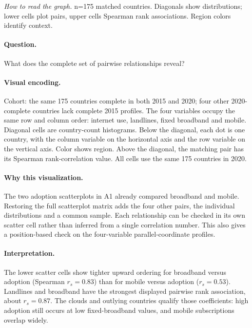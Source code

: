 \documentclass[conference,a4paper]{IEEEtran}
\begin{document}
\noindent\textit{How to read the graph.} n=175 matched countries. Diagonals show distributions; lower cells plot pairs, upper cells Spearman rank associations. Region colors identify context.

\paragraph{Question.} What does the complete set of pairwise relationships reveal?



\paragraph{Visual encoding.} Cohort: the same 175 countries complete in both 2015 and 2020; four other 2020-complete countries lack complete 2015 profiles. The four variables occupy the same row and column order: internet use, landlines, fixed broadband and mobile. Diagonal cells are country-count histograms. Below the diagonal, each dot is one country, with the column variable on the horizontal axis and the row variable on the vertical axis. Color shows region. Above the diagonal, the matching pair has its Spearman rank-correlation value. All cells use the same 175 countries in 2020.



\paragraph{Why this visualization.} The two adoption scatterplots in A1 already compared broadband and mobile. Restoring the full scatterplot matrix adds the four other pairs, the individual distributions and a common sample. Each relationship can be checked in its own scatter cell rather than inferred from a single correlation number. This also gives a position-based check on the four-variable parallel-coordinate profiles.



\paragraph{Interpretation.} The lower scatter cells show tighter upward ordering for broadband versus adoption (Spearman $r_s = 0.83$) than for mobile versus adoption ($r_s = 0.53$). Landlines and broadband have the strongest displayed pairwise rank association, about $r_s = 0.87$. The clouds and outlying countries qualify those coefficients: high adoption still occurs at low fixed-broadband values, and mobile subscriptions overlap widely.
\end{document}
